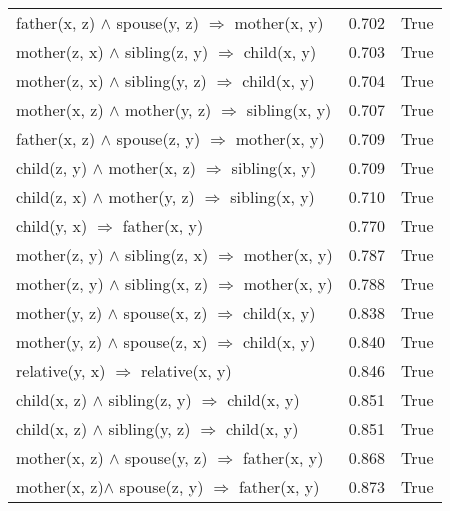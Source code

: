 \begin{longtable}{lrl}
      father(x, z) $\wedge$ spouse(y, z)   $\Rightarrow$ mother(x, y) &           0.702 &                     True \\
      mother(z, x) $\wedge$ sibling(z, y)   $\Rightarrow$ child(x, y) &           0.703 &                     True \\
      mother(z, x) $\wedge$ sibling(y, z)   $\Rightarrow$ child(x, y) &           0.704 &                     True \\
     mother(x, z) $\wedge$ mother(y, z)   $\Rightarrow$ sibling(x, y) &           0.707 &                     True \\
      father(x, z) $\wedge$ spouse(z, y)   $\Rightarrow$ mother(x, y) &           0.709 &                     True \\
      child(z, y) $\wedge$ mother(x, z)   $\Rightarrow$ sibling(x, y) &           0.709 &                     True \\
      child(z, x) $\wedge$ mother(y, z)   $\Rightarrow$ sibling(x, y) &           0.710 &                     True \\
                       child(y, x)   $\Rightarrow$ father(x, y) &           0.770 &                     True \\
     mother(z, y) $\wedge$ sibling(z, x)   $\Rightarrow$ mother(x, y) &           0.787 &                     True \\
     mother(z, y) $\wedge$ sibling(x, z)   $\Rightarrow$ mother(x, y) &           0.788 &                     True \\
       mother(y, z) $\wedge$ spouse(x, z)   $\Rightarrow$ child(x, y) &           0.838 &                     True \\
       mother(y, z) $\wedge$ spouse(z, x)   $\Rightarrow$ child(x, y) &           0.840 &                     True \\
                  relative(y, x)   $\Rightarrow$ relative(x, y) &           0.846 &                     True \\
       child(x, z) $\wedge$ sibling(z, y)   $\Rightarrow$ child(x, y) &           0.851 &                     True \\
       child(x, z) $\wedge$ sibling(y, z)   $\Rightarrow$ child(x, y) &           0.851 &                     True \\
      mother(x, z) $\wedge$ spouse(y, z)   $\Rightarrow$ father(x, y) &           0.868 &                     True \\
      mother(x, z)$\wedge$  spouse(z, y)   $\Rightarrow$ father(x, y) &           0.873 &                     True \\

\end{longtable}
